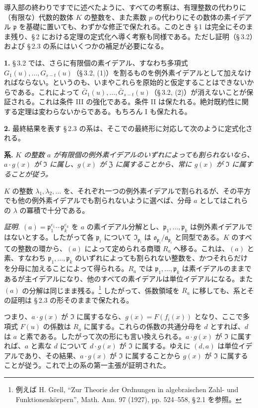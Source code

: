 導入部の終わりですでに述べたように、すべての考察は、有理整数の代わりに（有限な）代数的数体 $K$ の整数を、また素数 $p$ の代わりにその数体の素イデアル $\mathfrak{p}$ を基礎に置いても、わずかな修正で保たれる。このとき \S\,1 は完全にそのまま残り、\S\,2 における定理の定式化へ導く考察も同様である。ただし証明（\S\,3.2）および \S\,2.3 の系にはいくつかの補足が必要になる。

\medskip\noindent\textbf{1.}
\S\,3.2 では、さらに有限個の素イデアル、すなわち多項式 $G_1(u),\ldots,G_{s-t}(u)$（\S\,3.2, (1)）を割るものを例外素イデアルとして加えなければならない。というのも、いまやこれらを原始的と仮定することはできないからである。これによって $\bar G_1(u),\ldots,\bar G_{s-t}(u)$（\S\,3.2, (2)）が消えないことが保証される。これは条件 III の強化である。条件 II は保たれる。絶対既約性に関する定理は変わらないからである。もちろん I も保たれる。

\medskip\noindent\textbf{2.}
最終結果を表す \S\,2.3 の系は、そこでの最終形に対応して次のように定式化される。

\noindent\textbf{系.}
\emph{$K$ の整数 $a$ が有限個の例外素イデアルのいずれによっても割られないなら、$a\cdot g(x)$ が $\mathfrak{I}$ に属し、$g(x)$ が $\mathfrak{Z}$ に属することから、常に $g(x)$ が $\mathfrak{I}$ に属することが従う。}

$K$ の整数 $\lambda_1,\lambda_2,\ldots$ を、それぞれ一つの例外素イデアルで割られるが、その平方でも他の例外素イデアルでも割られないように選べば、分母 $a$ としてはこれらの $\lambda$ の冪積で十分である。

\noindent\emph{証明.}
$(a)=\mathfrak{p}_1^{e_1}\cdots\mathfrak{p}_k^{e_k}$ を $a$ の素イデアル分解とし、$\mathfrak{p}_1,\ldots,\mathfrak{p}_k$ は例外素イデアルではないとする。したがって各 $\mathfrak{p}_i$ について $\mathfrak{I}_{\mathfrak{p}_i}$ は $\mathfrak{o}_{\mathfrak{p}_i}/\mathfrak{a}_{\mathfrak{p}_i}$ と同型である。$K$ のすべての整数の環から、$(a)$ によって定められる商環 $R_a$ へ移る。これは、$(a)$ と素、すなわち $\mathfrak{p}_1,\ldots,\mathfrak{p}_k$ のいずれによっても割られない整数を、かつそれらだけを分母に加えることによって得られる。$R_a$ では $\mathfrak{p}_1,\ldots,\mathfrak{p}_k$ は素イデアルのままであるが主イデアルになり、他のすべての素イデアルは単位イデアルになる。また $(a)$ の分解は同じまま残る。\footnote{例えば H. Grell, ``Zur Theorie der Ordnungen in algebraischen Zahl- und Funktionenkörpern'', Math. Ann. 97 (1927), pp. 524--558, \S\,2.1 を参照。} したがって、係数領域を $R_a$ に移しても、系とその証明は \S\,2.3 の形そのままで保たれる。

つまり、$a\cdot g(x)$ が $\mathfrak{I}$ に属するなら、$g(x)=F(f_i(x))$ となり、ここで多項式 $F(u)$ の係数は $R_a$ に属する。これらの係数の共通分母を $d$ とすれば、$d$ は $a$ と素である。したがって次の形にも言い換えられる。$a\cdot g(x)$ が $\mathfrak{I}$ に属すれば、$a$ と素な $d$ について $d\cdot g(x)$ が $\mathfrak{I}$ に属する。ゆえに $(d,a)$ は単位イデアルであり、その結果、$a\cdot g(x)$ が $\mathfrak{I}$ に属することから $g(x)$ が $\mathfrak{I}$ に属することが従う。これで上の系の第一主張が証明された。

